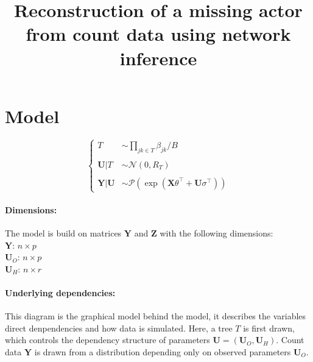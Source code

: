 \documentclass[11pt,a4paper]{article}
\title{Reconstruction of a missing actor from count data using network inference}
\newcommand{\Xbf}{\boldsymbol{X}}
\newcommand{\Ybf}{\boldsymbol{Y}}
\newcommand{\Zbf}{\boldsymbol{Z}}
\newcommand{\Ubf}{\boldsymbol{U}}
\newcommand{\edgeunit}{1.5}
\begin{document}
\maketitle
\vspace{3cm}
\tableofcontents
\newpage
\section{Model}

$$\left\{\begin{array}{rl}
T & \sim\prod_{jk \in T} \beta_{jk}/B \\\\
\Ubf |T& \sim\mathcal{N}(0,R_T)\\\\
\Ybf|\Ubf&\sim\mathcal{P}( \exp( \Xbf\theta^\intercal + \Ubf\sigma^\intercal) )
\end{array} \right.$$

\paragraph{Dimensions:}
The model is build on matrices $\Ybf$ and $\Zbf$ with the following dimensions:\\
$\Ybf$: $n\times p$\\
$\Ubf_O$: $n\times p$\\
$\Ubf_H$: $n\times r$


\paragraph{Underlying dependencies:} This diagram is the graphical model behind the model, it describes the variables direct denpendencies and how data is simulated. Here, a tree $T$ is first drawn, which controls the dependency structure of parameters $\Ubf = (\Ubf_O,\Ubf_H)$. Count data $\Ybf$ is drawn from a distribution depending only on observed parameters $\Ubf_O$.
\begin{center}
\end{center}
\end{document}
